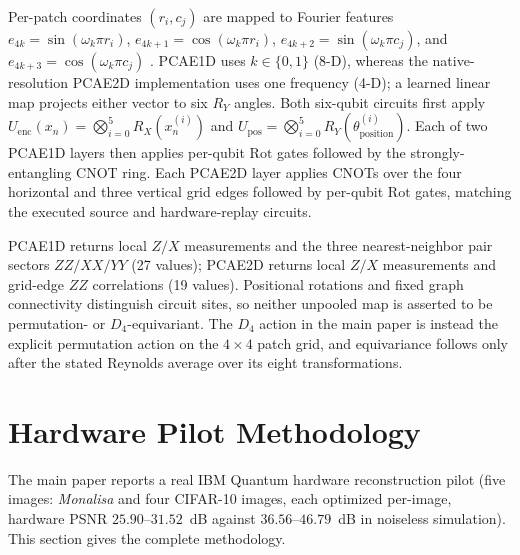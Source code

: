 \documentclass[11pt]{article}
\begin{document}
\begin{sloppypar}
Per-patch coordinates $(r_i,c_j)$ are mapped to Fourier features $e_{4k}=\sin(\omega_k\pi r_i)$, $e_{4k+1}=\cos(\omega_k\pi r_i)$, $e_{4k+2}=\sin(\omega_k\pi c_j)$, and $e_{4k+3}=\cos(\omega_k\pi c_j)$ \cite{Xu2021}. PCAE1D uses $k\in\{0,1\}$ (8-D), whereas the native-resolution PCAE2D implementation uses one frequency (4-D); a learned linear map projects either vector to six $R_Y$ angles. Both six-qubit circuits first apply $U_{\text{enc}}(x_n)=\bigotimes_{i=0}^{5}R_X(x_n^{(i)})$ and $U_{\text{pos}}=\bigotimes_{i=0}^{5}R_Y(\theta_{\text{position}}^{(i)})$. Each of two PCAE1D layers then applies per-qubit $\mathrm{Rot}$ gates followed by the strongly-entangling CNOT ring. Each PCAE2D layer applies CNOTs over the four horizontal and three vertical grid edges followed by per-qubit $\mathrm{Rot}$ gates, matching the executed source and hardware-replay circuits.

PCAE1D returns local $Z/X$ measurements and the three nearest-neighbor pair sectors $ZZ/XX/YY$ (27 values); PCAE2D returns local $Z/X$ measurements and grid-edge $ZZ$ correlations (19 values). Positional rotations and fixed graph connectivity distinguish circuit sites, so neither unpooled map is asserted to be permutation- or $D_4$-equivariant. The $D_4$ action in the main paper is instead the explicit permutation action on the $4\times4$ patch grid, and equivariance follows only after the stated Reynolds average over its eight transformations.
\end{sloppypar}

\section{Hardware Pilot Methodology}
\label{sec:hardware_methodology}
The main paper reports a real IBM Quantum hardware reconstruction pilot (five images: \textit{Monalisa} and four CIFAR-10 images, each optimized per-image, hardware PSNR $25.90$--$31.52$~dB against $36.56$--$46.79$~dB in noiseless simulation). This section gives the complete methodology.
\end{document}
